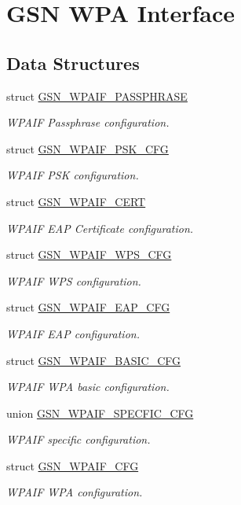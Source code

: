 \hypertarget{a00687}{
\section{GSN WPA Interface}
\label{a00687}
}
\subsection*{Data Structures}
\begin{DoxyCompactItemize}
\item 
struct \hyperlink{a00424}{GSN\_\-WPAIF\_\-PASSPHRASE}
\begin{DoxyCompactList}\small\item\em WPAIF Passphrase configuration. \end{DoxyCompactList}\item 
struct \hyperlink{a00425}{GSN\_\-WPAIF\_\-PSK\_\-CFG}
\begin{DoxyCompactList}\small\item\em WPAIF PSK configuration. \end{DoxyCompactList}\item 
struct \hyperlink{a00421}{GSN\_\-WPAIF\_\-CERT}
\begin{DoxyCompactList}\small\item\em WPAIF EAP Certificate configuration. \end{DoxyCompactList}\item 
struct \hyperlink{a00427}{GSN\_\-WPAIF\_\-WPS\_\-CFG}
\begin{DoxyCompactList}\small\item\em WPAIF WPS configuration. \end{DoxyCompactList}\item 
struct \hyperlink{a00423}{GSN\_\-WPAIF\_\-EAP\_\-CFG}
\begin{DoxyCompactList}\small\item\em WPAIF EAP configuration. \end{DoxyCompactList}\item 
struct \hyperlink{a00420}{GSN\_\-WPAIF\_\-BASIC\_\-CFG}
\begin{DoxyCompactList}\small\item\em WPAIF WPA basic configuration. \end{DoxyCompactList}\item 
union \hyperlink{a00426}{GSN\_\-WPAIF\_\-SPECFIC\_\-CFG}
\begin{DoxyCompactList}\small\item\em WPAIF specific configuration. \end{DoxyCompactList}\item 
struct \hyperlink{a00422}{GSN\_\-WPAIF\_\-CFG}
\begin{DoxyCompactList}\small\item\em WPAIF WPA configuration. \end{DoxyCompactList}\end{DoxyCompactItemize}
